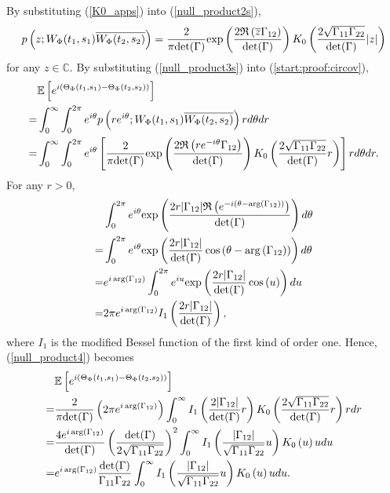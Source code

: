 \documentclass{amsart}
\begin{document}
By substituting  (\ref{K0_apps}) into (\ref{null_product2s}),
\begin{align}\label{null_product3s}
p\left(z;W_{\Phi}(t_{1},s_{1})\overline{W_{\Phi}(t_{2},s_{2})}\right)
=
\frac{2}{\pi\textup{det}(\Gamma)}\textup{exp}
\left(
\frac{2\mathfrak{R}\left(\overline{z}\Gamma_{12}
\right)}{\det(\Gamma)}\right)
K_{0}\left(\frac{2\sqrt{\Gamma_{11}\Gamma_{22}}}{\det(\Gamma)}|z|\right)
\end{align}
for any $z\in \mathbb{C}$.
By substituting (\ref{null_product3s}) into (\ref{start:proof:circov}),
\begin{align}\notag
&\mathbb{E}\left[e^{i(\Theta_{\Phi}(t_{1},s_{1})-\Theta_{\Phi}(t_{2},s_{2}))}\right]
\\\notag=&\int_{0}^{\infty}\int_{0}^{2\pi}e^{i\theta}p\left(re^{i\theta}; W_{\Phi}(t_{1},s_{1})\overline{W_{\Phi}(t_{2},s_{2})}\right)
rd\theta dr
\\\label{null_product4}=&
\int_{0}^{\infty}\int_{0}^{2\pi}e^{i\theta}
\left[
\frac{2}{\pi\textup{det}(\Gamma)}\textup{exp}
\left(
\frac{2\mathfrak{R}\left(re^{-i\theta}\Gamma_{12}
\right)}{\det(\Gamma)}\right)
K_{0}\left(\frac{2\sqrt{\Gamma_{11}\Gamma_{22}}}{\det(\Gamma)}r\right)
\right]
rd\theta dr.
\end{align}
For any $r>0$,
\begin{align}\notag
&\int_{0}^{2\pi}e^{i\theta}
\textup{exp}
\left(
\frac{2r|\Gamma_{12}|\mathfrak{R}\left(e^{-i(\theta-\arg\left(\Gamma_{12}\right))}
\right)}{\det(\Gamma)}\right)
d\theta
\\\notag=&\int_{0}^{2\pi}e^{i\theta}
\textup{exp}
\left(
\frac{2r|\Gamma_{12}|}
{\det(\Gamma)}\cos\left(\theta-\arg\left(\Gamma_{12}\right)\right)\right)
d\theta
\\\notag=&e^{i\arg\left(\Gamma_{12}\right)}\int_{0}^{2\pi}e^{iu}
\textup{exp}
\left(
\frac{2r|\Gamma_{12}|}
{\det(\Gamma)}\cos\left(u\right)\right)
du
\\\notag=& 2\pi e^{i\arg\left(\Gamma_{12}\right)}I_{1}\left(\frac{2r|\Gamma_{12}|}
{\det(\Gamma)}\right),
\end{align}
where $I_{1}$ is the modified Bessel function of the first kind of order one.
Hence, (\ref{null_product4}) becomes
\begin{align}\label{null_product4s}
&\mathbb{E}\left[e^{i(\Theta_{\Phi}(t_{1},s_{1})-\Theta_{\Phi}(t_{2},s_{2}))}\right]
\\\notag=&
\frac{2}{\pi\textup{det}(\Gamma)}
\left(2\pi e^{i\arg\left(\Gamma_{12}\right)}\right)
\int_{0}^{\infty}
I_{1}\left(\frac{2|\Gamma_{12}|}
{\det(\Gamma)}r\right)
K_{0}\left(\frac{2\sqrt{\Gamma_{11}\Gamma_{22}}}{\det(\Gamma)}r\right)
rdr
\\\notag=&
\frac{4e^{i\arg\left(\Gamma_{12}\right)}}{\textup{det}(\Gamma)}
\left(\frac{\det(\Gamma)}{2\sqrt{\Gamma_{11}\Gamma_{22}}}\right)^{2}
\int_{0}^{\infty}
I_{1}\left(\frac{|\Gamma_{12}|}{\sqrt{\Gamma_{11}\Gamma_{22}}}u
\right)
K_{0}\left(u\right)
udu
\\\notag=&
e^{i\arg\left(\Gamma_{12}\right)}
\frac{\det(\Gamma)}{\Gamma_{11}\Gamma_{22}}
\int_{0}^{\infty}
I_{1}\left(\frac{|\Gamma_{12}|}{\sqrt{\Gamma_{11}\Gamma_{22}}}u
\right)
K_{0}\left(u\right)
udu.
\end{align}
\end{document}
